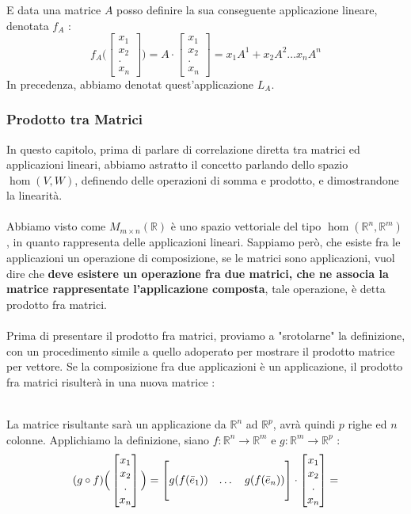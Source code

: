 \documentclass[12pt, letterpaper]{article}
\newcommand{\R}{{\mathbb R}}
\newcommand{\acc}{\\\hphantom{}\\}
\begin{document}
E data una matrice \(A\) posso definire la sua conseguente applicazione lineare, denotata \(f_A\) :
$$
f_A\Big(\begin{bmatrix}
    x_1\\x_2\\.\\x_n
\end{bmatrix}\Big)=A\cdot \begin{bmatrix}
    x_1\\x_2\\.\\x_n
\end{bmatrix}=x_1A^1+x_2A^2\dots x_nA^n
$$
In precedenza, abbiamo denotat quest'applicazione \(L_A\).
\subsubsection{Prodotto tra Matrici}
In questo capitolo, prima di parlare di correlazione diretta tra matrici ed applicazioni lineari, abbiamo astratto il concetto 
parlando dello spazio \(\hom(V,W)\), definendo delle operazioni di somma e prodotto, e dimostrandone la linearità.\acc Abbiamo visto 
come \(M_{m\times n}(\R)\) è uno spazio vettoriale del tipo \(\hom(\R^n,\R^m)\), in quanto rappresenta delle applicazioni 
lineari. Sappiamo però, che esiste fra le applicazioni un operazione di composizione, se le matrici sono applicazioni, vuol 
dire che \textbf{deve esistere un operazione fra due matrici, che ne associa la matrice rappresentate l'applicazione composta}, 
tale operazione, è detta prodotto fra matrici.\acc 
Prima di presentare il prodotto fra matrici, proviamo a "srotolarne" la definizione, con un procedimento simile a quello 
adoperato per mostrare il prodotto matrice per vettore. Se la composizione fra due applicazioni è un applicazione, il 
prodotto fra matrici risulterà in una nuova matrice :
\begin{figure}[h]
    \end{figure}\\
La matrice risultante sarà un applicazione da \(\R^n\) ad \(\R^p\), avrà quindi \(p\) righe ed \(n\) colonne. Applichiamo la 
definizione, siano \(f:\R^n\rightarrow \R^m\) e  \(g:\R^m\rightarrow \R^p\) : 
$$
(g\circ f)\Big(\begin{bmatrix}
    x_1\\x_2\\.\\x_n
\end{bmatrix}\Big)=\begin{bmatrix}             
    \hphantom{}&\hphantom{}&\hphantom{}\\
    g(f(\bar e_1))&\dots&g(f(\bar e_n))\\
    \hphantom{}&\hphantom{}&\hphantom{}
\end{bmatrix}\cdot \begin{bmatrix}
    x_1\\x_2\\.\\x_n
\end{bmatrix}=
$$
\end{document}
